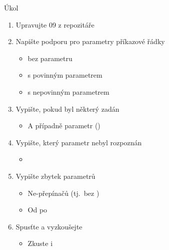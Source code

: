\begin{frame}{Úkol}

  \begin{enumerate}
    \item Upravujte 09 z repozitáře
    \item Napište podporu pro parametry příkazové řádky
    \begin{itemize}
      \item {} bez parametru
      \item {} s povinným parametrem
      \item {} s nepovinným parametrem
    \end{itemize}

    \item Vypište, pokud byl některý zadán
    \begin{itemize}
      \item A případně parametr ()
    \end{itemize}

    \item Vypište, který parametr nebyl rozpoznán
    \begin{itemize}
      \item {}
    \end{itemize}

    \item Vypište zbytek parametrů
    \begin{itemize}
      \item Ne-přepínačů (tj.\ bez \code{\-})
      \item Od  po 
    \end{itemize}

    \item Spusťte a vyzkoušejte
    \begin{itemize}
      \item Zkuste i 
    \end{itemize}
  \end{enumerate}

\end{frame}

